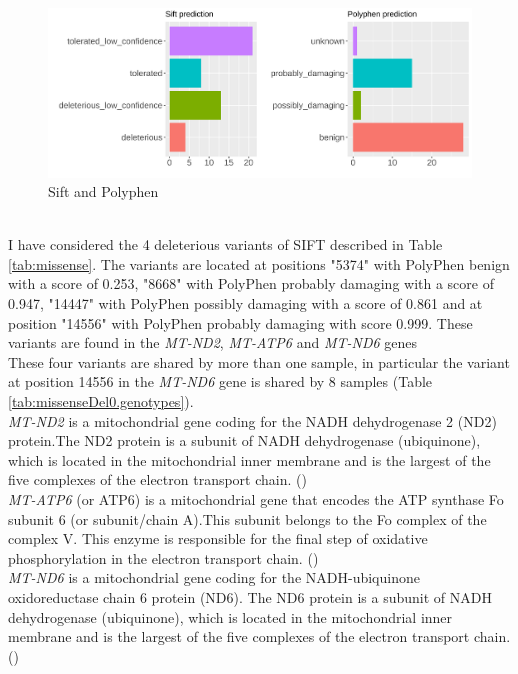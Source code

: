 \begin{figure}[h]
\includegraphics[width=\textwidth]{Fig/plots2.png}
\caption{Sift and Polyphen}
\label{fig:siftpolyphen}
\end{figure}\\


I have considered the 4 deleterious variants of SIFT described in Table \ref{tab:missense}. The variants are located at positions "5374" with PolyPhen  benign with a score of 0.253, "8668" with PolyPhen probably damaging with a score of 0.947, "14447" with PolyPhen possibly damaging with a score of 0.861 and at position "14556" with PolyPhen probably damaging with score 0.999. These variants are found in the \textit {MT-ND2}, \textit{MT-ATP6} and \textit{MT-ND6} genes\\ 
These four variants are shared by more than one sample, in particular the variant at position 14556 in the \textit{MT-ND6} gene is shared by 8 samples (Table \ref{tab:missenseDel0.genotypes}). \\

\textit{MT-ND2} is a mitochondrial gene coding for the NADH dehydrogenase 2 (ND2) protein.The ND2 protein is a subunit of NADH dehydrogenase (ubiquinone), which is located in the mitochondrial inner membrane and is the largest of the five complexes of the electron transport chain. (\cite{ncbi2016database})\\
\textit{MT-ATP6} (or ATP6) is a mitochondrial gene that encodes the ATP synthase Fo subunit 6 (or subunit/chain A).This subunit belongs to the Fo complex of the complex V. This enzyme is responsible for the final step of oxidative phosphorylation in the electron transport chain. (\cite{ncbi2016database})\\

\textit{MT-ND6} is a mitochondrial gene coding for the NADH-ubiquinone oxidoreductase chain 6 protein (ND6). The ND6 protein is a subunit of NADH dehydrogenase (ubiquinone), which is located in the mitochondrial inner membrane and is the largest of the five complexes of the electron transport chain.
 (\cite{ncbi2016database})\\


